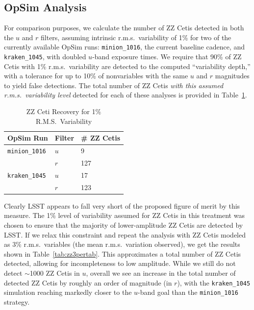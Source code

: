 
\subsection{OpSim Analysis}
\label{sec:\secname:analysis}

For comparison purposes, we calculate the number of ZZ Cetis detected in
both the $u$ and $r$ filters, assuming intrinsic r.m.s.\ variability of
1\% for two of the currently available OpSim runs: {\tt minion\_1016},
the current baseline cadence, and {\tt kraken\_1045}, with doubled
$u$-band exposure times. We require that 90\% of ZZ Cetis with 1\%
r.m.s.\  variability are detected to the computed ``variability depth,''
with a tolerance for up to 10\% of nonvariables with the same $u$ and
$r$ magnitudes to yield false detections.  The total number of ZZ Cetis
\emph{with this assumed r.m.s.\ variability level} detected for each of these
analyses is provided in Table~\ref{tab:zz1pertab}.


\begin{table}[h]
\begin{center}
    \caption{ZZ Ceti Recovery for 1\% R.M.S.\ Variability}\label{tab:zz1pertab}
    \begin{tabular}{| l | l | l |}
    \hline
    OpSim Run & Filter & \# ZZ Cetis \\ \hline
     {\tt minion\_1016} & $u$ & 9  \\
      & $r$ & 127 \\ \hline
    {\tt kraken\_1045}  & $u$ & 17\\
    & $r$ & 123  \\ \hline
    \end{tabular}
\end{center}
\end{table}

Clearly LSST appears to fall very short of the proposed figure of merit
by this measure.   The 1\% level of variability assumed for ZZ Cetis in
this treatment was chosen to ensure that the majority of lower-amplitude
ZZ Cetis are detected by LSST.  If we relax this constraint and repeat the
analysis with ZZ Cetis modeled as 3\% r.m.s.\ variables (the mean
r.m.s.\ variation observed), we get the results shown in Table~\ref{tab:zz3pertab}.
This approximates a total number of ZZ Cetis detected, allowing for
incompleteness to low amplitude.  While we still do not detect
$\sim$1000 ZZ Cetis in $u$, overall we see an increase in the total
number of detected ZZ Cetis by roughly an order of magnitude (in $r$),
with the {\tt kraken\_1045} simulation reaching markedly closer to the
$u$-band goal than the {\tt minion\_1016} strategy.



